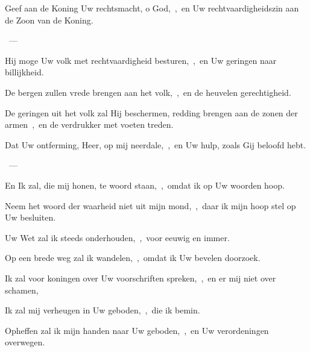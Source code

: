 \documentclass[12pt,twoside,a5paper]{article}
\begin{document}
\begin{halfparskip}
   
\end{halfparskip}

\begin{halfparskip}
  Geef aan de Koning Uw rechtsmacht, o God,~\sep\ en Uw rechtvaardigheidszin aan de Zoon van de Koning.

  ~--- 

  Hij moge Uw volk met rechtvaardigheid besturen,~\sep\ en Uw geringen naar billijkheid.

  De bergen zullen vrede brengen aan het volk,~\sep\ en de heuvelen gerechtigheid.

  De geringen uit het volk zal Hij beschermen, redding brengen aan de zonen der armen~\sep\ en de verdrukker met voeten treden.
\end{halfparskip}

\begin{halfparskip}
   
\end{halfparskip}

\begin{halfparskip}
  Dat Uw ontferming, Heer, op mij neerdale,~\sep\ en Uw hulp, zoals Gij beloofd hebt.

  ~--- 

  En Ik zal, die mij honen, te woord staan,~\sep\ omdat ik op Uw woorden hoop.

  Neem het woord der waarheid niet uit mijn mond,~\sep\ daar ik mijn hoop stel op Uw besluiten.

  Uw Wet zal ik steeds onderhouden,~\sep\ voor eeuwig en immer.

  Op een brede weg zal ik wandelen,~\sep\ omdat ik Uw bevelen doorzoek.

  Ik zal voor koningen over Uw voorschriften spreken,~\sep\ en er mij niet over schamen,

  Ik zal mij verheugen in Uw geboden,~\sep\ die ik bemin.

  Opheffen zal ik mijn handen naar Uw geboden,~\sep\ en Uw verordeningen overwegen.
\end{halfparskip}

\begin{halfparskip}
   
\end{halfparskip}
\end{document}
